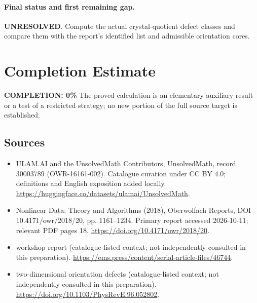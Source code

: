 \documentclass[11pt]{article}
\begin{document}
\paragraph{Final status and first remaining gap.}
\textbf{UNRESOLVED}. Compute the actual crystal-quotient defect classes and compare them with the report’s identified list and admissible orientation cores.

\section{Completion Estimate}
\noindent\textbf{COMPLETION: 0\%}
The proved calculation is an elementary auxiliary result or a test of a restricted strategy; no new portion of the full source target is established.

\subsection{Sources}
\begin{itemize}
\item[\hypertarget{source:30003789:1}{S1}] ULAM.AI and the UnsolvedMath Contributors, UnsolvedMath, record 30003789 (OWR-16161-002). Catalogue curation under CC BY 4.0; definitions and English exposition added locally.
\url{https://huggingface.co/datasets/ulamai/UnsolvedMath}.
\item[\hypertarget{source:30003789:2}{S2}] Nonlinear Data: Theory and Algorithms (2018), Oberwolfach Reports, DOI 10.4171/owr/2018/20, pp. 1161--1234. Primary report accessed 2026-10-11; relevant PDF pages 18.
\url{https://doi.org/10.4171/owr/2018/20}.
\item[\hypertarget{source:30003789:3}{S3}] workshop report (catalogue-listed context; not independently consulted in this preparation).
\url{https://ems.press/content/serial-article-files/46744}.
\item[\hypertarget{source:30003789:4}{S4}] two-dimensional orientation defects (catalogue-listed context; not independently consulted in this preparation).
\url{https://doi.org/10.1103/PhysRevE.96.052802}.
\end{itemize}
\label{end:30003789}
\end{document}
